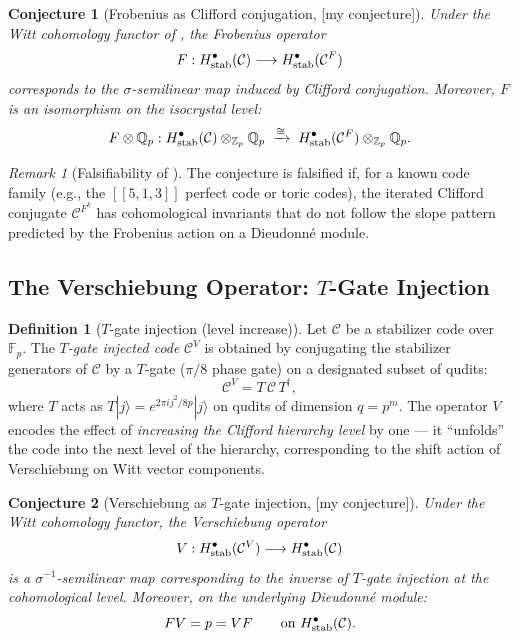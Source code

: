 \documentclass[12pt]{article}
\theoremstyle{definition}
\newtheorem{definition}{Definition}[section]
\theoremstyle{plain}
\newtheorem{conjecture}{Conjecture}[section]
\theoremstyle{remark}
\newtheorem{remark}{Remark}[section]
\newcommand{\myconj}{{\color{orange}[\textsf{my conjecture}]}}
\newcommand{\Fp}{\mathbb{F}_p}
\newcommand{\Zp}{\mathbb{Z}_p}
\newcommand{\Qp}{\mathbb{Q}_p}
\newcommand{\cC}{\mathcal{C}}
\begin{document}
\begin{conjecture}[Frobenius as Clifford conjugation, \myconj]\label{conj:F-clifford}
Under the Witt cohomology functor of , the Frobenius operator
\[
F:H^{\bullet}_{\textup{stab}}(\cC)\longrightarrow H^{\bullet}_{\textup{stab}}(\cC^F)
\]
corresponds to the $\sigma$-semilinear map induced by Clifford conjugation. Moreover, $F$ is an isomorphism on the isocrystal level:
\[
F\otimes\Qp: H^{\bullet}_{\textup{stab}}(\cC)\otimes_{\Zp}\Qp\;\xrightarrow{\cong}\; H^{\bullet}_{\textup{stab}}(\cC^F)\otimes_{\Zp}\Qp.
\]
\end{conjecture}

\begin{remark}[Falsifiability of ]
The conjecture is falsified if, for a known code family (e.g., the $[[5,1,3]]$ perfect code or toric codes), the iterated Clifford conjugate $\cC^{F^k}$ has cohomological invariants that do not follow the slope pattern predicted by the Frobenius action on a Dieudonn\'{e} module.
\end{remark}

\subsection{The Verschiebung Operator: $T$-Gate Injection}

\begin{definition}[$T$-gate injection (level increase)]
Let $\cC$ be a stabilizer code over $\Fp$. The \emph{$T$-gate injected code} $\cC^V$ is obtained by conjugating the stabilizer generators of $\cC$ by a $T$-gate ($\pi/8$ phase gate) on a designated subset of qudits:
\[
\cC^V = T\,\cC\,T^{\dagger},
\]
where $T$ acts as $T|j\rangle=e^{2\pi i j^2/8p}|j\rangle$ on qudits of dimension $q=p^m$. The operator $V$ encodes the effect of \emph{increasing the Clifford hierarchy level} by one — it ``unfolds'' the code into the next level of the hierarchy, corresponding to the shift action of Verschiebung on Witt vector components.
\end{definition}

\begin{conjecture}[Verschiebung as $T$-gate injection, \myconj]\label{conj:V-Tgate}
Under the Witt cohomology functor, the Verschiebung operator
\[
V:H^{\bullet}_{\textup{stab}}(\cC^V)\longrightarrow H^{\bullet}_{\textup{stab}}(\cC)
\]
is a $\sigma^{-1}$-semilinear map corresponding to the inverse of $T$-gate injection at the cohomological level. Moreover, on the underlying Dieudonn\'{e} module:
\[
FV = p = VF\qquad\text{on }H^{\bullet}_{\textup{stab}}(\cC).
\]
\end{conjecture}
\end{document}
